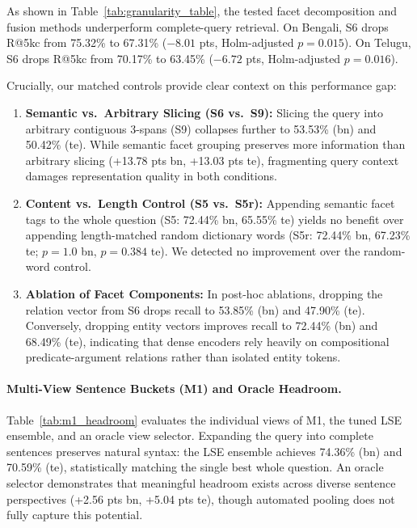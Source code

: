 \documentclass[11pt]{article}
\begin{document}
As shown in Table~\ref{tab:granularity_table}, the tested facet decomposition and fusion methods underperform complete-query retrieval. On Bengali, S6 drops R@5kc from 75.32\% to 67.31\% ($-8.01$ pts, Holm-adjusted $p=0.015$). On Telugu, S6 drops R@5kc from 70.17\% to 63.45\% ($-6.72$ pts, Holm-adjusted $p=0.016$).

Crucially, our matched controls provide clear context on this performance gap:
\begin{enumerate}
    \item \textbf{Semantic vs.\ Arbitrary Slicing (S6 vs.\ S9):} Slicing the query into arbitrary contiguous 3-spans (S9) collapses further to 53.53\% (bn) and 50.42\% (te). While semantic facet grouping preserves more information than arbitrary slicing (+13.78 pts bn, +13.03 pts te), fragmenting query context damages representation quality in both conditions.
    \item \textbf{Content vs.\ Length Control (S5 vs.\ S5r):} Appending semantic facet tags to the whole question (S5: 72.44\% bn, 65.55\% te) yields no benefit over appending length-matched random dictionary words (S5r: 72.44\% bn, 67.23\% te; $p=1.0$ bn, $p=0.384$ te). We detected no improvement over the random-word control.
    \item \textbf{Ablation of Facet Components:} In post-hoc ablations, dropping the relation vector from S6 drops recall to 53.85\% (bn) and 47.90\% (te). Conversely, dropping entity vectors improves recall to 72.44\% (bn) and 68.49\% (te), indicating that dense encoders rely heavily on compositional predicate-argument relations rather than isolated entity tokens.
\end{enumerate}

\paragraph{Multi-View Sentence Buckets (M1) and Oracle Headroom.} Table~\ref{tab:m1_headroom} evaluates the individual views of M1, the tuned LSE ensemble, and an oracle view selector. Expanding the query into complete sentences preserves natural syntax: the LSE ensemble achieves 74.36\% (bn) and 70.59\% (te), statistically matching the single best whole question. An oracle selector demonstrates that meaningful headroom exists across diverse sentence perspectives (+2.56 pts bn, +5.04 pts te), though automated pooling does not fully capture this potential.
\end{document}
